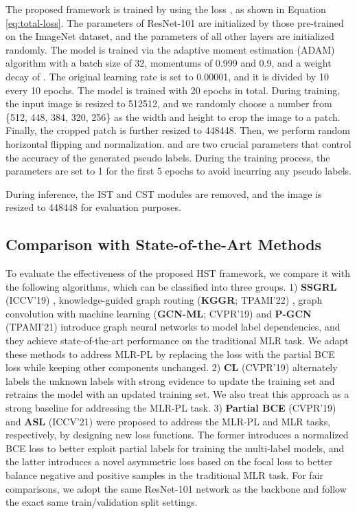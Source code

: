 The proposed framework is trained by using the loss , as shown in Equation \ref{eq:total-loss}. The parameters of ResNet-101 are initialized by those pre-trained on the ImageNet \cite{deng2009imagenet} dataset, and the parameters of all other layers are initialized randomly. The model is trained via the adaptive moment estimation (ADAM) algorithm \cite{kingma2015adam} with a batch size of 32, momentums of 0.999 and 0.9, and a weight decay of . The original learning rate is set to 0.00001, and it is divided by 10 every 10 epochs. The model is trained with 20 epochs in total. During training, the input image is resized to 512512, and we randomly choose a number from \{512, 448, 384, 320, 256\} as the width and height to crop the image to a patch. Finally, the cropped patch is further resized to 448448. Then, we perform random horizontal flipping and normalization.  and  are two crucial parameters that control the accuracy of the generated pseudo labels. During the training process, the parameters are set to 1 for the first 5 epochs to avoid incurring any pseudo labels.

During inference, the IST and CST modules are removed, and the image is resized to 448448 for evaluation purposes.

\subsection{Comparison with State-of-the-Art Methods}
To evaluate the effectiveness of the proposed HST framework, we compare it with the following algorithms, which can be classified into three groups. 1) \textbf{SSGRL} (ICCV'19) \cite{chen2019learning}, knowledge-guided graph routing (\textbf{KGGR}; TPAMI'22) \cite{chen2022knowledge}, graph convolution with machine learning (\textbf{GCN-ML}; CVPR'19) \cite{chen2019multi} and \textbf{P-GCN} (TPAMI'21) \cite{chen2021p-gcn} introduce graph neural networks to model label dependencies, and they achieve state-of-the-art performance on the traditional MLR task. We adapt these methods to address MLR-PL by replacing the loss with the partial BCE loss while keeping other components unchanged. 2) \textbf{CL} (CVPR'19) \cite{durand2019learning} alternately labels the unknown labels with strong evidence to update the training set and retrains the model with an updated training set. We also treat this approach as a strong baseline for addressing the MLR-PL task. 3) \textbf{Partial BCE} (CVPR'19) \cite{durand2019learning} and \textbf{ASL} (ICCV'21) \cite{ridnik2021asymmetric} were proposed to address the MLR-PL and MLR tasks, respectively, by designing new loss functions. The former introduces a normalized BCE loss to better exploit partial labels for training the multi-label models, and the latter introduces a novel asymmetric loss based on the focal loss \cite{lin2017focal-loss} to better balance negative and positive samples in the traditional MLR task. For fair comparisons, we adopt the same ResNet-101 network as the backbone and follow the exact same train/validation split settings.

